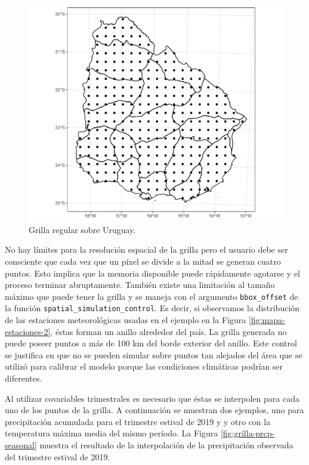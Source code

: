 \documentclass[
  12pt]{article}
\begin{document}
\begin{figure}[H]

{\centering \includegraphics{Manual_Generador_files/figure-latex/grilla-regular-1} 

}

\caption{Grilla regular sobre Uruguay.}\label{fig:grilla-regular}
\end{figure}

No hay límites para la resolución espacial de la grilla pero el usuario debe ser consciente que cada vez que un píxel se divide a la mitad se generan cuatro puntos. Esto implica que la memoria disponible puede rápidamente agotarse y el proceso terminar abruptamente. También existe una limitación al tamaño máximo que puede tener la grilla y se maneja con el argumento \texttt{bbox\_offset} de la función \texttt{spatial\_simulation\_control}. Es decir, si observamos la distribución de las estaciones meteorológicas usadas en el ejemplo en la Figura \ref{fig:mapa-estaciones-2}, éstas forman un anillo alrededor del país. La grilla generada no puede poseer puntos a más de 100 km del borde exterior del anillo. Este control se justifica en que no se pueden simular sobre puntos tan alejados del área que se utilizó para calibrar el modelo porque las condiciones climáticas podrían ser diferentes.

Al utilizar covariables trimestrales es necesario que éstas se interpolen para cada uno de los puntos de la grilla. A continuación se muestran dos ejemplos, uno para precipitación acumulada para el trimestre estival de 2019 y y otro con la temperatura máxima media del mismo período. La Figura \ref{fig:grilla-prcp-seasonal} muestra el resultado de la interpolación de la precipitación observada del trimestre estival de 2019.
\end{document}
